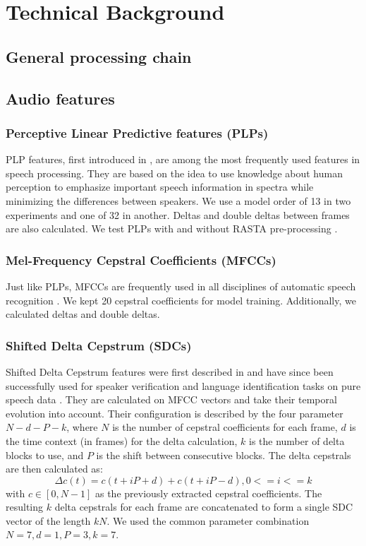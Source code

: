 \chapter{Technical Background}	\label{chap:background}
\section{General processing chain}
\section{Audio features}
\subsection{Perceptive Linear Predictive features (PLPs)} PLP features, first introduced in \cite{hermansky90}, are among the most frequently used features in speech processing. They are based on the idea to use knowledge about human perception to emphasize important speech information in spectra while minimizing the differences between speakers. We use a model order of 13 in two experiments and one of 32 in another. Deltas and double deltas between frames are also calculated. We test PLPs with and without RASTA pre-processing \cite{rasta_plp}.
\subsection{Mel-Frequency Cepstral Coefficients (MFCCs)} Just like PLPs, MFCCs are frequently used in all disciplines of automatic speech recognition \cite{zissman}. We kept 20 cepstral coefficients for model training. Additionally, we calculated deltas and double deltas.
\subsection{Shifted Delta Cepstrum (SDCs)} Shifted Delta Cepstrum features were first described in \cite{bielefeld} and have since been successfully used for speaker verification and language identification tasks on pure speech data \cite{torres} \cite{campbell} \cite{allen}. They are calculated on MFCC vectors and take their temporal evolution into account. Their configuration is described by the four parameter $N-d-P-k$, where $N$ is the number of cepstral coefficients for each frame, $d$ is the time context (in frames) for the delta calculation, $k$ is the number of delta blocks to use, and $P$ is the shift between consecutive blocks. The delta cepstrals are then calculated as:
\begin{equation}
\Delta c(t) = c(t+iP+d)+c(t+iP-d), 0<=i<=k
\end{equation}
with $c \in [0, N-1]$ as the previously extracted cepstral coefficients. The resulting $k$ delta cepstrals for each frame are concatenated to form a single SDC vector of the length $kN$. We used the common parameter combination $N=7, d=1, P=3, k=7$.
